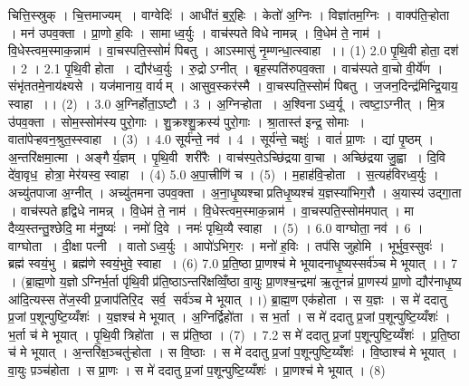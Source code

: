 
\setcounter{anuvakam}{0}
चित्ति॒स्स्रुक् । चि॒त्तमाज्यम् । वाग्वेदिः॑ । आधी॑तं ब॒ऱ्॒हिः । केतो॑ अ॒ग्निः । विज्ञा॑तम॒ग्निः । वाक्प॑ति॒ऱ्होता । मन॑ उपव॒क्ता । प्रा॒णो ह॒विः । सामाध्व॒र्युः । वाच॑स्पते विधे नामन्न् । वि॒धेम॑ ते॒ नाम॑ । वि॒धेस्त्वम॒स्माक॒न्नाम॑ । वा॒चस्पति॒स्सोमं॑ पिबतु । आऽस्मासु॑ नृ॒म्णन्धा॒त्स्वाहा ।। (1)
2.0
पृ॒थि॒वी होता॒ दश॑ । 2 ।
2.1
पृ॒थि॒वी होता । द्यौर॑ध्व॒र्युः । रु॒द्रोऽग्नीत् । बृह॒स्पति॑रुपव॒क्ता । वाच॑स्पते वा॒चो वी॒र्ये॑ण । संभृ॑ततमे॒नाय॑क्ष्यसे । यज॑मानाय॒ वार्यम् । आसुव॒स्कर॑स्मै । वा॒चस्पति॒स्सोमं॑ पिबतु । ज॒जन॒दिन्द्र॑मिन्द्रि॒याय॒ स्वाहा ।। (2) ।
3.0
अ॒ग्निर्होता॒ऽष्टौ । 3 ।
अ॒ग्निऱ्होता । अ॒श्विनाऽध्व॒र्यू । त्वष्टा॒ऽग्नीत् । मि॒त्र उ॑पव॒क्ता । सोम॒स्सोम॑स्य पुरो॒गाः । शु॒क्रश्शु॒क्रस्य॑ पुरो॒गाः । श्रा॒तास्त॑ इन्द्र॒ सोमाः । वाता॑पेऱ्हवन॒श्रुत॒स्स्वाहा । (3) ।
4.0
सूर्य॑न्ते॒ नव॑ । 4 ।
सूर्य॑न्ते॒ चक्षुः॑ । वातं॑ प्रा॒णः । द्यां पृ॒ष्ठम् । अ॒न्तरि॑क्षमा॒त्मा । अङ्गैर्य॒ज्ञम् । पृ॒थि॒वी शरी॑रैः । वाच॑स्प॒तेऽच्छि॑द्रया वा॒चा । अच्छि॑द्रया जु॒ह्वा । दि॒वि दे॑वा॒वृध॒ होत्रा॒ मेर॑यस्व॒ स्वाहा । (4)
5.0
अ॒पा॒त्त्रीणि॑ च । (5) ।
म॒हाह॑वि॒ऱ्होता । स॒त्यह॑विरध्व॒र्युः । अच्यु॑तपाजा अ॒ग्नीत् । अच्यु॑तमना उपव॒क्ता । अ॒ना॒धृ॒ष्यश्चाप्रतिधृ॒ष्यश्च॑ य॒ज्ञस्या॑भिग॒रौ । अ॒यास्य॑ उद्गा॒ता । वाच॑स्पते हृद्विधे नामन्न् । वि॒धेम॑ ते॒ नाम॑ । वि॒धेस्त्वम॒स्माक॒न्नाम॑ । वा॒चस्पति॒स्सोम॑मपात् । मा दैव्य॒स्तन्तु॒श्छेदि॒ मा म॑नु॒ष्यः॑ । नमो॑ दि॒वे । नमः॑ पृथि॒व्यै स्वाहा । (5) ।
6.0
वाग्घोता॒ नव॑ । 6 ।
वाग्घोता । दी॒क्षा पत्नी । वातोऽध्व॒र्युः । आपो॑ऽभिग॒रः । मनो॑ ह॒विः । तप॑सि जुहोमि । भूर्भुव॒स्सुवः॑ । ब्रह्म॑ स्वयं॒भु । ब्रह्म॑णे स्वयं॒भुवे॒ स्वाहा । (6)
7.0
प्र॒ति॒ष्ठा प्रा॒णश्च॑ मे भूयादनाधृ॒ष्यस्सर्व॑ञ्च मे भूयात् ।। 7 । (ब्रा॒ह्म॒णो य॒ज्ञोऽग्निर्भ॒र्ता पृ॑थि॒वी प्र॑ति॒ष्ठाऽन्तरि॑क्षव्विँ॒ष्ठा वा॒युः प्रा॒णश्च॒न्द्रमा॑ ऋ॒तूनन्नं॑ प्रा॒णस्य॑ प्रा॒णो द्यौर॑नाधृ॒ष्य आ॑दि॒त्यस्स ते॑ज॒स्वी प्र॒जाप॑तिरि॒द सर्व॒ सर्व॑ञ्च मे भूयात् ।।)
ब्रा॒ह्म॒ण एक॑होता । स य॒ज्ञः । स मे॑ ददातु प्र॒जां प॒शून्पुष्टि॒य्यँशः॑ । य॒ज्ञश्च॑ मे भूयात् । अ॒ग्निर्द्विहो॑ता । स भ॒र्ता । स मे॑ ददातु प्र॒जां प॒शून्पुष्टि॒य्यँशः॑ । भ॒र्ता च॑ मे भूयात् । पृ॒थि॒वी त्रिहो॑ता । स प्र॑ति॒ष्ठा । (7) ।
7.2
स मे॑ ददातु प्र॒जां प॒शून्पुष्टि॒य्यँशः॑ । प्र॒ति॒ष्ठा च॑ मे भूयात् । अ॒न्तरि॑क्ष॒ञ्चतु॑ऱ्होता । स वि॒ष्ठाः । स मे॑ ददातु प्र॒जां प॒शून्पुष्टि॒य्यँशः॑ । वि॒ष्ठाश्च॑ मे भूयात् । वा॒युः प़ञ्च॑होता । स प्रा॒णः । स मे॑ ददातु प्र॒जां प॒शून्पुष्टि॒य्यँशः॑ । प्रा॒णश्च॑ मे भूयात् । (8)
